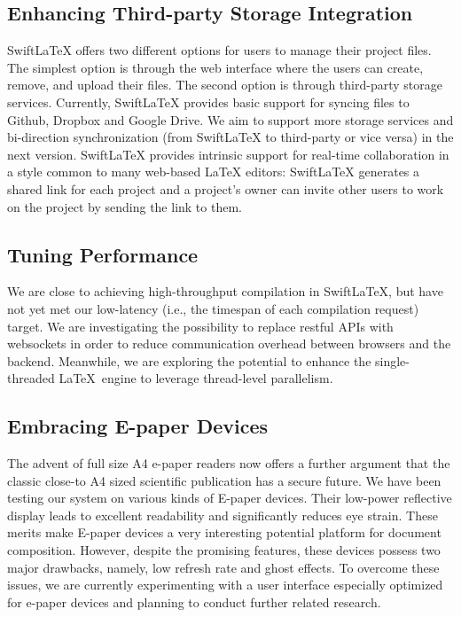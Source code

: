 \documentclass[sigconf]{acmart}
\begin{document}
\subsection{Enhancing Third-party Storage Integration}
SwiftLaTeX offers two different options for users to manage their project files.
The simplest option is through the web interface where the users can create, remove, and upload their files. 
The second option is through third-party storage services.
Currently, SwiftLaTeX provides basic support for syncing files to Github, Dropbox and Google Drive. We aim to support more storage services and bi-direction synchronization (from SwiftLaTeX to third-party or vice versa) in the next version.
SwiftLaTeX provides intrinsic support for real-time collaboration in a style common to many web-based LaTeX editors: SwiftLaTeX generates a shared link for each project and a project's owner can invite other users to work on the project by sending the link to them. 

\subsection{Tuning Performance}
We are close to achieving high-throughput compilation in SwiftLaTeX, but have not yet met our low-latency (i.e., the timespan of each compilation request) target.
We are investigating the possibility to replace restful APIs with websockets in order to reduce communication overhead between  browsers and the backend. 
Meanwhile, we are exploring the potential to enhance the single-threaded \LaTeX\ engine to leverage thread-level parallelism. 

\subsection{Embracing E-paper Devices}
The advent of full size A4 e-paper readers now offers a further argument that the classic close-to A4 sized scientific publication has a secure future. 
We have been testing our system on various kinds of E-paper devices. Their low-power reflective display leads to excellent readability and significantly reduces eye strain. These merits make E-paper devices a very interesting potential platform for document composition.
However, despite the promising features, these devices possess two major drawbacks, namely, low refresh rate and ghost effects.
To overcome these issues, we are currently experimenting with a user interface especially optimized for e-paper devices and planning to conduct further related research.
\end{document}
